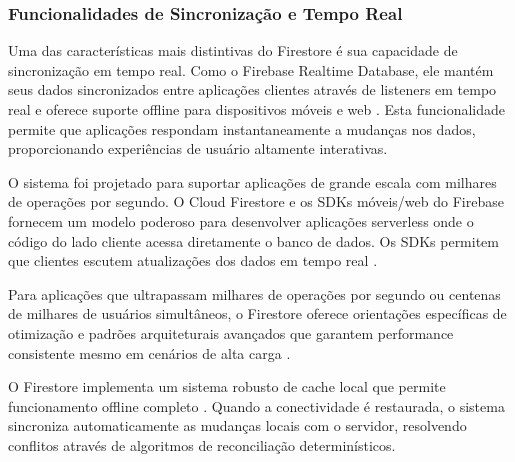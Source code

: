 \subsubsection{Funcionalidades de Sincronização e Tempo Real}

Uma das características mais distintivas do Firestore é sua capacidade de sincronização em tempo real. Como o Firebase Realtime Database, ele mantém seus dados sincronizados entre aplicações clientes através de listeners em tempo real e oferece suporte offline para dispositivos móveis e web \cite{firebase_choose_database}. Esta funcionalidade permite que aplicações respondam instantaneamente a mudanças nos dados, proporcionando experiências de usuário altamente interativas.

O sistema foi projetado para suportar aplicações de grande escala com milhares de operações por segundo. O Cloud Firestore e os SDKs móveis/web do Firebase fornecem um modelo poderoso para desenvolver aplicações serverless onde o código do lado cliente acessa diretamente o banco de dados. Os SDKs permitem que clientes escutem atualizações dos dados em tempo real \cite{firebase_firestore_docs}.

Para aplicações que ultrapassam milhares de operações por segundo ou centenas de milhares de usuários simultâneos, o Firestore oferece orientações específicas de otimização e padrões arquiteturais avançados que garantem performance consistente mesmo em cenários de alta carga \cite{firebase_realtime_scale}.

O Firestore implementa um sistema robusto de cache local que permite funcionamento offline completo \cite{firebase_choose_database}. Quando a conectividade é restaurada, o sistema sincroniza automaticamente as mudanças locais com o servidor, resolvendo conflitos através de algoritmos de reconciliação determinísticos.

\begin{comment}
Uma característica distintiva do Firestore reside em suas capacidades de sincronização automática e atualizações em tempo real \cite{firebase2023realtime}. O sistema implementa listeners de dados que permitem às aplicações cliente receber notificações instantâneas sempre que ocorrem alterações nos dados armazenados, eliminando a necessidade de polling manual ou requisições periódicas para verificação de atualizações. Esta funcionalidade é fundamental para o desenvolvimento de aplicações colaborativas, sistemas de mensagens instantâneas e interfaces que requerem refletir mudanças de estado imediatas.

O mecanismo de sincronização offline representa outro aspecto tecnológico significativo, permitindo que aplicações continuem operando mesmo durante períodos de conectividade intermitente ou ausente \cite{terry2013replicated}. O Firestore mantém uma cache local dos dados utilizados pela aplicação, sincronizando automaticamente as alterações quando a conectividade é restabelecida, garantindo consistência eventual dos dados distribuídos.
\end{comment}

